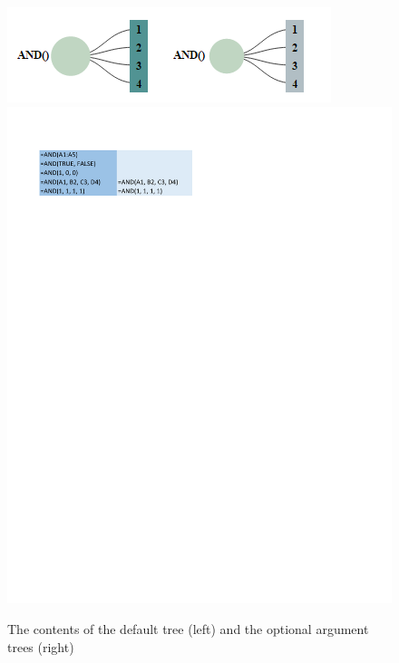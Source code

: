 \documentclass[conference]{IEEEtran}
\begin{document}
	\begin{figure}[h] \centering \includegraphics[width =
		.46\textwidth]{comparison} \includegraphics[]{comparison-ss} \caption{The
			contents of the default tree (left) and the optional argument trees (right)}
		\label{fig:optional} \end{figure}
	
	
	
\end{document}

